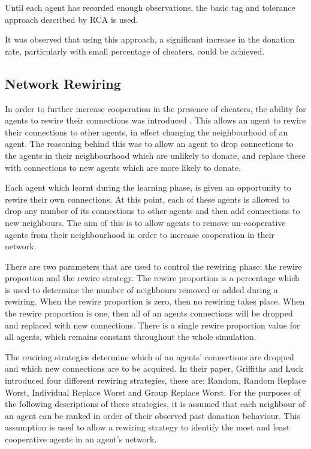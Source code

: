 Until each agent has recorded enough observations,
the basic tag and tolerance approach described by RCA is used.

It was observed that using this approach,
a significant increase in the donation rate, particularly
with small percentage of cheaters, could be achieved.

\subsection{Network Rewiring}

In order to further increase cooperation in the presence of cheaters,
the ability for agents to rewire their connections was introduced \cite{aamas2010}.
This allows an agent to rewire their connections to other agents, in effect changing the neighbourhood of an agent.
The reasoning behind this was to allow an agent to drop connections to the agents in their neighbourhood which are unlikely to donate, and replace these with connections to new agents which are more likely to donate.

Each agent which learnt during the learning phase,
is given an opportunity to rewire their own connections.
At this point, each of these agents is allowed to drop any number of its
connections to other agents and then add connections to new neighbours.
The aim of this is to allow agents to remove un-cooperative agents from
their neighbourhood in order to increase cooperation in their network.

There are two parameters that are used to control the rewiring phase:
the rewire proportion and the rewire strategy.
The rewire proportion is a percentage which is used to determine the number of
neighbours removed or added during a rewiring.
When the rewire proportion is zero, then no rewiring takes place.
When the rewire proportion is one, then all of an agents connections will be dropped and replaced with new connections.
There is a single rewire proportion value for all agents, which remains constant throughout the whole simulation.

The rewiring strategies determine which of an agents' connections are dropped and which new connections are to be acquired.
In their paper, Griffiths and Luck introduced four different rewiring strategies,
these are: Random, Random Replace Worst, Individual Replace Worst and Group Replace Worst.
For the purposes of the following descriptions of these strategies,
it is assumed that each neighbour of an agent can be ranked in order of their observed past donation behaviour.
This assumption is used to allow a rewiring strategy to identify the most and least cooperative agents in an agent's network.

